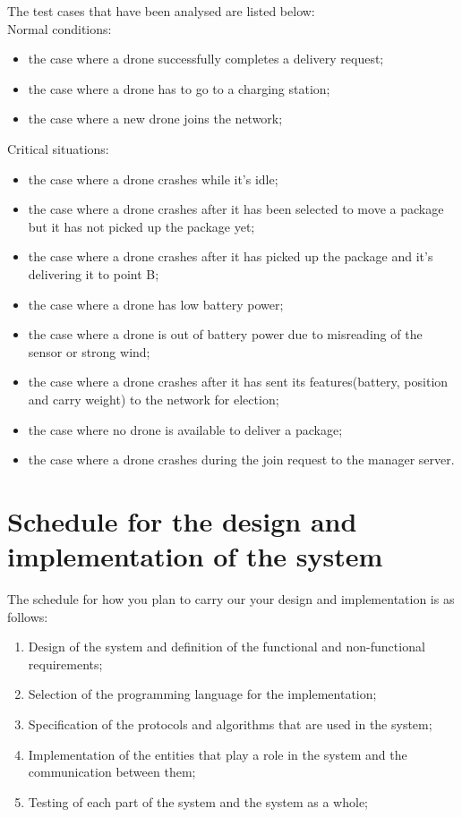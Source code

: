 \documentclass[a4paper, oneside]{memoir}
\begin{document}
The test cases that have been analysed are listed below:\\

Normal conditions:
\begin{itemize}
	\item the case where a drone successfully completes a delivery request;
	\item the case where a drone has to go to a charging station;
	\item the case where a new drone joins the network;
\end{itemize}

Critical situations:
\begin{itemize}
	\item the case where a drone crashes while it's idle;
	\item the case where a drone crashes after it has been selected to move a package but it has not picked up the package yet;
	\item the case where a drone crashes after it has picked up the package and it's delivering it to point B;
	\item the case where a drone has low battery power;
	\item the case where a drone is out of battery power due to misreading of the sensor or strong wind;
	\item the case where a drone crashes after it has sent its features(battery, position and carry weight) to the network for election;
	\item the case where no drone is available to deliver a package;
	\item the case where a drone crashes during the join request to the manager server.
\end{itemize}


\section{Schedule for the design and implementation of the system}
The schedule for how you plan to carry our your design and implementation is as follows:
\begin{enumerate}
\item Design of the system and definition of the functional and non-functional requirements;
\item Selection of the programming language for the implementation;
\item Specification of the protocols and algorithms that are used in the system;
\item Implementation of the entities that play a role in the system and the communication between them;
\item Testing of each part of the system and the system as a whole;
\end{enumerate}
\end{document}
